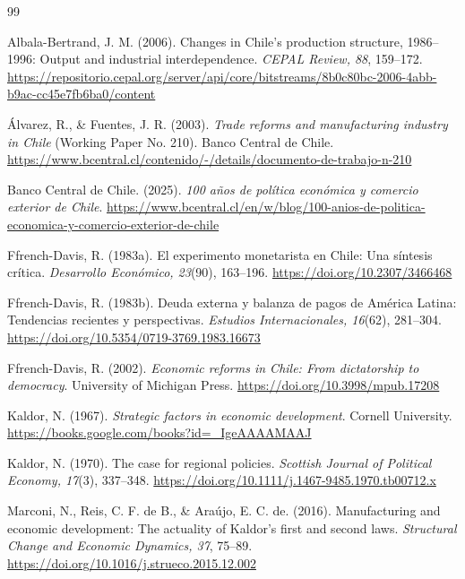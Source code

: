 \documentclass[11pt]{article}
\begin{document}
\FloatBarrier
\begin{thebibliography}{99}
\pagestyle{fancy}
\raggedright

Albala-Bertrand, J. M. (2006). Changes in Chile's production structure, 1986--1996: Output and industrial interdependence. \textit{CEPAL Review, 88}, 159--172.
\url{https://repositorio.cepal.org/server/api/core/bitstreams/8b0c80bc-2006-4abb-b9ac-cc45e7fb6ba0/content}

Álvarez, R., \& Fuentes, J. R. (2003). \textit{Trade reforms and manufacturing industry in Chile} (Working Paper No. 210). Banco Central de Chile.
\url{https://www.bcentral.cl/contenido/-/details/documento-de-trabajo-n-210}

Banco Central de Chile. (2025). \textit{100 años de política económica y comercio exterior de Chile}.
\url{https://www.bcentral.cl/en/w/blog/100-anios-de-politica-economica-y-comercio-exterior-de-chile}

Ffrench-Davis, R. (1983a). El experimento monetarista en Chile: Una síntesis crítica. \textit{Desarrollo Económico, 23}(90), 163--196.
\url{https://doi.org/10.2307/3466468}

Ffrench-Davis, R. (1983b). Deuda externa y balanza de pagos de América Latina: Tendencias recientes y perspectivas. \textit{Estudios Internacionales, 16}(62), 281--304.
\url{https://doi.org/10.5354/0719-3769.1983.16673}

Ffrench-Davis, R. (2002). \textit{Economic reforms in Chile: From dictatorship to democracy}. University of Michigan Press.
\url{https://doi.org/10.3998/mpub.17208}

Kaldor, N. (1967). \textit{Strategic factors in economic development}. Cornell University.
\url{https://books.google.com/books?id=\_IgeAAAAMAAJ}

Kaldor, N. (1970). The case for regional policies. \textit{Scottish Journal of Political Economy, 17}(3), 337--348.
\url{https://doi.org/10.1111/j.1467-9485.1970.tb00712.x}

Marconi, N., Reis, C. F. de B., \& Araújo, E. C. de. (2016). Manufacturing and economic development: The actuality of Kaldor's first and second laws. \textit{Structural Change and Economic Dynamics, 37}, 75--89.
\url{https://doi.org/10.1016/j.strueco.2015.12.002}


\end{thebibliography}
\end{document}
